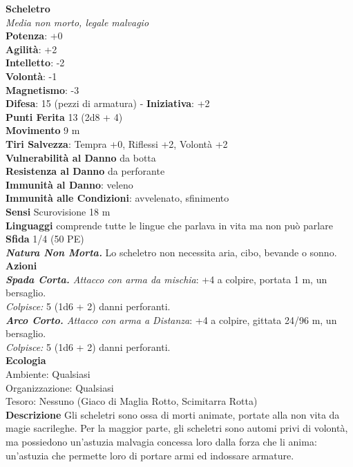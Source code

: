 \begin{multicols}{2}
\medskip\textbf{Scheletro}\\
\emph{Media non morto, legale malvagio}\\
\textbf{Potenza}: +0\\
\textbf{Agilità}: +2\\
\textbf{Intelletto}: -2\\
\textbf{Volontà}: -1\\
\textbf{Magnetismo}: -3\\
\textbf{Difesa}: 15 (pezzi di armatura) - \textbf{Iniziativa}: +2\\
\textbf{Punti Ferita} 13 (2d8 + 4)\\
\textbf{Movimento} 9 m\\
\textbf{Tiri Salvezza}: Tempra +0, Riflessi +2, Volontà +2\\
\textbf{Vulnerabilità al Danno} da botta\\
\textbf{Resistenza al Danno} da perforante\\
\textbf{Immunità al Danno}: veleno\\
\textbf{Immunità alle Condizioni}: avvelenato, sfinimento\\
\textbf{Sensi} Scurovisione 18 m\\
\textbf{Linguaggi} comprende tutte le lingue che parlava in vita ma non può parlare\\
\textbf{Sfida} 1/4 (50 PE)\smallskip\\
\emph{\textbf{Natura Non Morta.}} Lo scheletro non necessita aria, cibo, bevande o sonno.\\
\smallskip\textbf{Azioni}\\
\emph{\textbf{Spada Corta.} Attacco con arma da mischia}: +4 a colpire, portata 1 m, un bersaglio.\\
\emph{Colpisce:} 5 (1d6 + 2) danni perforanti.\\
\emph{\textbf{Arco Corto.} Attacco con arma a Distanza}: +4 a colpire, gittata 24/96 m, un bersaglio.\\
\emph{Colpisce:} 5 (1d6 + 2) danni perforanti.\\
\textbf{Ecologia}\\
Ambiente: Qualsiasi\\
Organizzazione: Qualsiasi\\
Tesoro: Nessuno (Giaco di Maglia Rotto, Scimitarra Rotta)\\
\textbf{Descrizione}
Gli scheletri sono ossa di morti animate, portate alla non vita da magie sacrileghe. Per la maggior parte, gli scheletri sono automi privi di volontà, ma possiedono un’astuzia malvagia concessa loro dalla forza che li anima: un’astuzia che permette loro di portare armi ed indossare armature.\\



\end{multicols}

